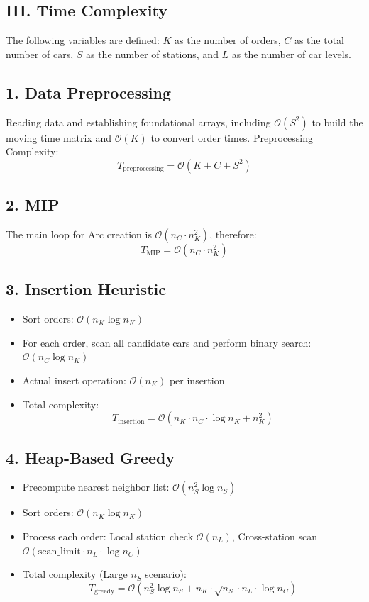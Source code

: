 \documentclass[12pt,a4paper]{article}
\begin{document}
\subsection*{III. Time Complexity}

The following variables are defined: $K$ as the number of orders, $C$ as the total number of cars, $S$ as the number of stations, and $L$ as the number of car levels.

\subsection*{1. Data Preprocessing}
Reading data and establishing foundational arrays, including $\mathcal{O}(S^2)$ to build the moving time matrix and $\mathcal{O}(K)$ to convert order times. Preprocessing Complexity:
$$ T_{\text{preprocessing}} = \mathcal{O}(K + C + S^2) $$

\subsection*{2. MIP}
The main loop for Arc creation is $\mathcal{O}(n_C \cdot n_K^2)$, therefore:
$$T_{\text{MIP}} = \mathcal{O}(n_C \cdot n_K^2)$$

\subsection*{3. Insertion Heuristic}
\begin{itemize}
    \item Sort orders: $\mathcal{O}(n_K \log n_K)$
    \item For each order, scan all candidate cars and perform binary search: $\mathcal{O}(n_C \log n_K)$
    \item Actual insert operation: $\mathcal{O}(n_K)$ per insertion
    \item Total complexity:
    $$T_{\text{insertion}} = \mathcal{O}(n_K \cdot n_C \cdot \log n_K + n_K^2)$$
\end{itemize}

\subsection*{4. Heap-Based Greedy}
\begin{itemize}
    \item Precompute nearest neighbor list: $\mathcal{O}(n_S^2 \log n_S)$
    \item Sort orders: $\mathcal{O}(n_K \log n_K)$
    \item Process each order: Local station check $\mathcal{O}(n_L)$, Cross-station scan $\mathcal{O}(\text{scan\_limit} \cdot n_L \cdot \log n_C)$
    \item Total complexity (Large $n_S$ scenario):
    $$T_{\text{greedy}} = \mathcal{O}(n_S^2 \log n_S + n_K \cdot \sqrt{n_S} \cdot n_L \cdot \log n_C)$$
\end{itemize}
\end{document}
